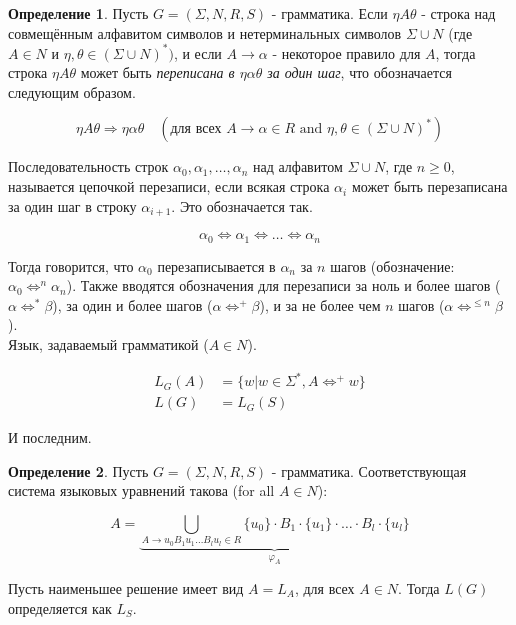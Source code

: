 \documentclass[a4paper]{article}
\theoremstyle{indented}
\theoremstyle{definition}
\newtheorem{defn}{Определение}
\theoremstyle{remark}
\DeclareMathOperator{\ra}{\rightarrow}
\DeclareMathOperator{\Ra}{\Rightarrow}
\DeclareMathOperator{\Lra}{\Leftrightarrow}
\begin{document}
\begin{defn}
    Пусть $G = (\Sigma, N, R, S)$ - грамматика. Если $\eta A \theta$ - строка над совмещённым алфавитом символов и нетерминальных символов $\Sigma \cup N$ (где $A \in N$ и $\eta,\theta \in (\Sigma\cup N)^*)$, и если $A \ra \alpha$ - некоторое правило для $A$, тогда строка $\eta A\theta$ может быть \textit{переписана в $\eta \alpha \theta$ за один шаг}, что обозначается следующим образом.

    \[
        \eta A\theta \Ra \eta \alpha \theta \; \; \: \: (\text{для всех } A \ra \alpha \in R \text{ and } \eta, \theta \in (\Sigma \cup N)^*)
    \]

    Последовательность строк $\alpha_0,\alpha_1,\ldots,\alpha_n$ над алфавитом $\Sigma\cup N$, где $n \geq 0$, называется цепочкой перезаписи, если всякая строка $\alpha_i$ может быть перезаписана за один шаг в строку $\alpha_{i+1}$. Это обозначается так.

    \[
        \alpha_0 \Lra \alpha_1 \Lra \ldots \Lra \alpha_n
    \]

    Тогда говорится, что $\alpha_0$ перезаписывается в $\alpha_n$ за $n$ шагов (обозначение: $\alpha_0 \Lra^n \alpha_n$). Также вводятся обозначения для перезаписи за ноль и более шагов ($\alpha \Lra^* \beta$), за один и более шагов ($\alpha \Lra^+ \beta$), и за не более чем $n$ шагов ($\alpha \Lra^{\leq n} \beta$). \\ 

    Язык, задаваемый грамматикой ($A \in N$). 

    \begin{equation*}
        \begin{aligned}
            L_G(A) &= \{w|w\in\Sigma^*, A\Lra^+ w\} \\ 
            L(G) &= L_G(S)
        \end{aligned}
    \end{equation*}
\end{defn}

И последним. 

\begin{defn}
    Пусть $G = (\Sigma,N,R,S)$ - грамматика. Соответствующая система языковых уравнений такова (for all $A \in N$):

    \[ 
        A = \underbrace{\bigcup_{A \ra u_0B_1u_1 \ldots B_lu_l \in R} \{u_0\} \cdot B_1 \cdot \{ u_1 \} \cdot \ldots \cdot B_l \cdot \{u_l \}}_{\varphi_A}
    \]

    Пусть наименьшее решение имеет вид $A = L_A$, для всех $A \in N$. Тогда $L(G)$ определяется как $L_S$.
\end{defn}
\end{document}
